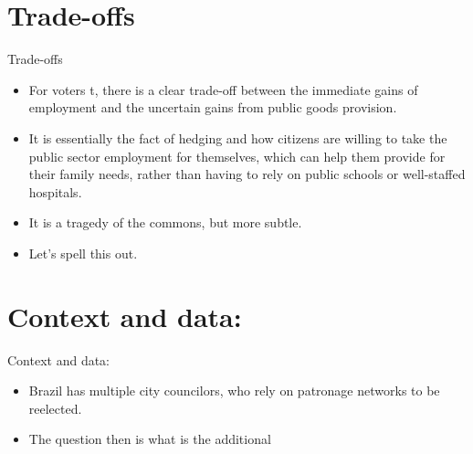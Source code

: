 \documentclass[
  ignorenonframetext,
]{beamer}
\providecommand{\tightlist}{%
  \setlength{\itemsep}{0pt}\setlength{\parskip}{0pt}}
\begin{document}
\hypertarget{trade-offs}{%
\section{Trade-offs}\label{trade-offs}}

\begin{frame}{Trade-offs}
\begin{itemize}
\tightlist
\item
  For voters t, there is a clear trade-off between the immediate gains
  of employment and the uncertain gains from public goods provision.
\item
  It is essentially the fact of hedging and how citizens are willing to
  take the public sector employment for themselves, which can help them
  provide for their family needs, rather than having to rely on public
  schools or well-staffed hospitals.
\item
  It is a tragedy of the commons, but more subtle.
\item
  Let's spell this out.
\end{itemize}
\end{frame}

\hypertarget{context-and-data}{%
\section{Context and data:}\label{context-and-data}}

\begin{frame}{Context and data:}
\begin{itemize}
\tightlist
\item
  Brazil has multiple city councilors, who rely on patronage networks to
  be reelected.
\item
  The question then is what is the additional
\end{itemize}
\end{frame}
\end{document}
